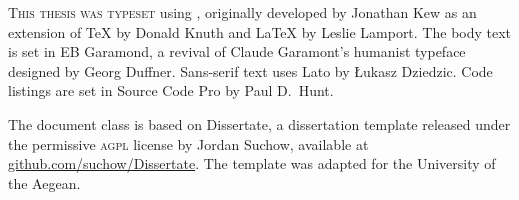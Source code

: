 \newpage
\thispagestyle{empty}
\vspace*{\fill}
\begin{center}
\parbox{280pt}{
\lettrine[lines=3,slope=-2pt,nindent=-4pt]{\textcolor{SchoolColor}{T}}{his thesis was typeset} using \XeLaTeX, originally developed by Jonathan Kew as an extension of \TeX{} by Donald Knuth and \LaTeX{} by Leslie Lamport. The body text is set in EB Garamond, a revival of Claude Garamont's humanist typeface designed by Georg Duffner. Sans-serif text uses Lato by \L{}ukasz Dziedzic. Code listings are set in Source Code Pro by Paul D.\ Hunt.

\medskip

The document class is based on Dissertate, a dissertation template released under the permissive \textsc{agpl} license by Jordan Suchow, available at \href{https://github.com/suchow/Dissertate}{github.com/suchow/Dissertate}. The template was adapted for the University of the Aegean.

\medskip

}
\end{center}
\vspace*{\fill}
